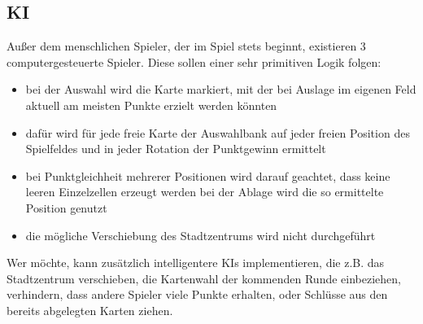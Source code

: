 \subsection{KI}
Außer dem menschlichen Spieler, der im Spiel stets beginnt, existieren 3 computergesteuerte Spieler. Diese sollen einer sehr primitiven Logik folgen:
\begin{itemize}
	\item bei der Auswahl wird die Karte markiert, mit der bei Auslage im eigenen Feld aktuell am meisten Punkte erzielt werden könnten
	\item dafür wird für jede freie Karte der Auswahlbank auf jeder freien Position des Spielfeldes und in jeder Rotation der Punktgewinn ermittelt
	\item bei Punktgleichheit mehrerer Positionen wird darauf geachtet, dass keine leeren Einzelzellen erzeugt werden
bei der Ablage wird die so ermittelte Position genutzt
	\item die mögliche Verschiebung des Stadtzentrums wird nicht durchgeführt
\end{itemize}
Wer möchte, kann zusätzlich intelligentere KIs implementieren, die z.B. das Stadtzentrum verschieben, die Kartenwahl der kommenden Runde einbeziehen, verhindern, dass andere Spieler viele Punkte erhalten, oder Schlüsse aus den bereits abgelegten Karten ziehen.


